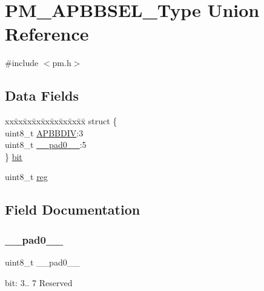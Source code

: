 \hypertarget{union_p_m___a_p_b_b_s_e_l___type}{}\section{P\+M\+\_\+\+A\+P\+B\+B\+S\+E\+L\+\_\+\+Type Union Reference}
\label{union_p_m___a_p_b_b_s_e_l___type}


{\ttfamily \#include $<$pm.\+h$>$}

\subsection*{Data Fields}
\begin{DoxyCompactItemize}
\item 
\begin{tabbing}
xx\=xx\=xx\=xx\=xx\=xx\=xx\=xx\=xx\=\kill
struct \{\\
\>uint8\_t \mbox{\hyperlink{union_p_m___a_p_b_b_s_e_l___type_a6af637dca59ed4a7f73ef0ca4927182a}{APBBDIV}}:3\\
\>uint8\_t \mbox{\hyperlink{union_p_m___a_p_b_b_s_e_l___type_a8b4eebe79ded0459acec2f4950102ba3}{\_\_pad0\_\_}}:5\\
\} \mbox{\hyperlink{union_p_m___a_p_b_b_s_e_l___type_aff78f5684f13434e6e2d97f91389247f}{bit}}\\

\end{tabbing}\item 
uint8\+\_\+t \mbox{\hyperlink{union_p_m___a_p_b_b_s_e_l___type_a9428adc9af4653a2050e2536b55dec8d}{reg}}
\end{DoxyCompactItemize}


\subsection{Field Documentation}
\mbox{\label{union_p_m___a_p_b_b_s_e_l___type_a8b4eebe79ded0459acec2f4950102ba3}} 
\subsubsection{\texorpdfstring{\_\_pad0\_\_}{\_\_pad0\_\_}}
{\footnotesize\ttfamily uint8\+\_\+t \+\_\+\+\_\+pad0\+\_\+\+\_\+}

bit\+: 3.. 7 Reserved \mbox{\label{union_p_m___a_p_b_b_s_e_l___type_a6af637dca59ed4a7f73ef0ca4927182a}} 
